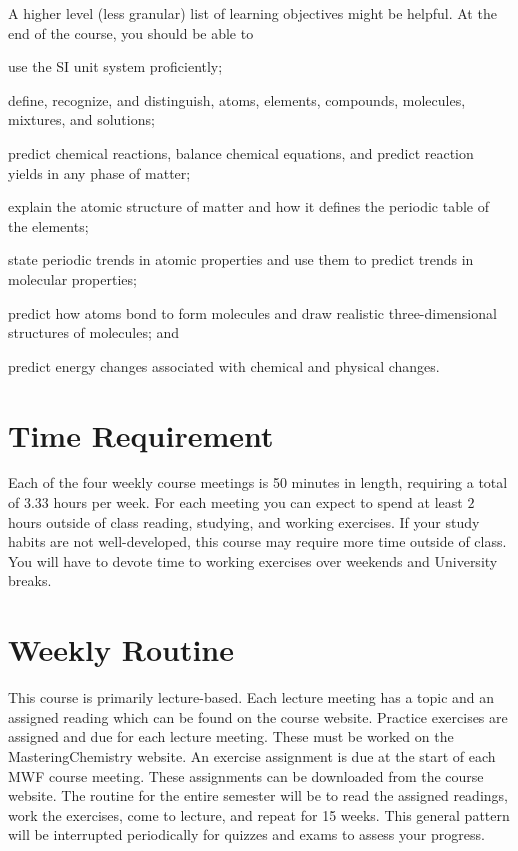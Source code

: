 \documentclass[letterpaper,oneside,onecolumn,11pt,article]{memoir}
\begin{document}
A higher level (less granular) list of learning objectives might be helpful. At the end of the course, you should be able to 
\begin{inparaenum}
\item use the SI unit system proficiently; 
\item define, recognize, and distinguish, atoms, elements, compounds, molecules, mixtures, and solutions; 
\item predict chemical reactions, balance chemical equations, and predict reaction yields in any phase of matter; 
\item explain the atomic structure of matter and how it defines the periodic table of the elements; 
\item state periodic trends in atomic properties and use them to predict trends in molecular properties; 
\item predict how atoms bond to form molecules and draw realistic three-dimensional structures of molecules; and
\item predict energy changes associated with chemical and physical changes.
\end{inparaenum}
\section{Time Requirement}

Each of the four weekly course meetings is 50 minutes in length, requiring a total of $3.33$ hours per week. For each meeting you can expect to spend at least $2$ hours outside of class reading, studying, and working exercises. If your study habits are not well-developed, this course may require more time outside of class. You will have to devote time to working exercises over weekends and University breaks. 

\section{Weekly Routine}
This course is primarily lecture-based. Each lecture meeting has a topic and an assigned reading which can be found on the course website. Practice exercises are assigned and due for each lecture meeting. These must be worked on the MasteringChemistry website. An exercise assignment is due at the start of each MWF course meeting. These assignments can be downloaded from the course website. The routine for the entire semester will be to read the assigned readings, work the exercises, come to lecture, and repeat for 15 weeks. This general pattern will be interrupted periodically for quizzes and exams to assess your progress. 
\end{document}
